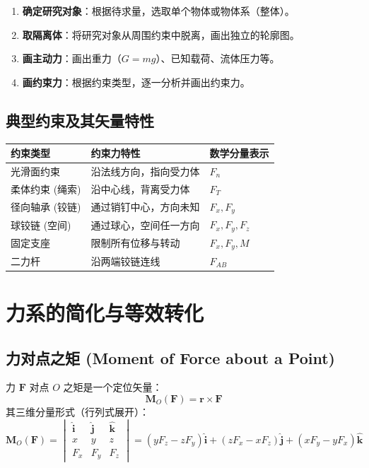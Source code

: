 \documentclass[12pt,a4paper]{article}
\newcommand{\vect}[1]{\mathbf{#1}}                   %
\newcommand{\unitv}[1]{\hat{\mathbf{#1}}}            %
\begin{document}
\begin{tcolorbox}[colback=blue!5!white, colframe=blue!75!black, title=标准化四步法]
\begin{enumerate}
    \item \textbf{确定研究对象}：根据待求量，选取单个物体或物体系（整体）。
    \item \textbf{取隔离体}：将研究对象从周围约束中脱离，画出独立的轮廓图。
    \item \textbf{画主动力}：画出重力（$G=mg$）、已知载荷、流体压力等。
    \item \textbf{画约束力}：根据约束类型，逐一分析并画出约束力。
\end{enumerate}
\end{tcolorbox}

\subsection{典型约束及其矢量特性}

\begin{longtable}{lll}
    \toprule
    \textbf{约束类型} & \textbf{约束力特性} & \textbf{数学分量表示} \\
    \midrule
    光滑面约束 & 沿法线方向，指向受力体 & $F_n$ \\
    柔体约束 (绳索) & 沿中心线，背离受力体 & $F_T$ \\
    径向轴承 (铰链) & 通过销钉中心，方向未知 & $F_x, F_y$ \\
    球铰链 (空间) & 通过球心，空间任一方向 & $F_x, F_y, F_z$ \\
    固定支座 & 限制所有位移与转动 & $F_x, F_y, M$ \\
    二力杆 & 沿两端铰链连线 & $F_{AB}$ \\
    \bottomrule
\end{longtable}

\section{力系的简化与等效转化}

\subsection{力对点之矩 (Moment of Force about a Point)}
力 $\vect{F}$ 对点 $O$ 之矩是一个定位矢量：
\begin{equation}
    \vect{M}_O(\vect{F}) = \vect{r} \times \vect{F}
\end{equation}
其三维分量形式（行列式展开）：
\begin{equation}
    \vect{M}_O(\vect{F}) = 
    \begin{vmatrix}
        \unitv{i} & \unitv{j} & \unitv{k} \\
        x & y & z \\
        F_x & F_y & F_z
    \end{vmatrix} = (yF_z - zF_y)\unitv{i} + (zF_x - xF_z)\unitv{j} + (xF_y - yF_x)\unitv{k}
\end{equation}
\end{document}
